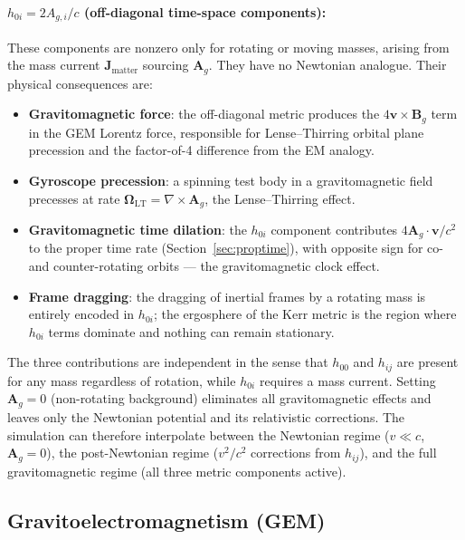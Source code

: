 \documentclass[11pt,a4paper]{article}
\newcommand{\vv}[1]{\mathbf{#1}}
\newcommand{\Ag}{\vv{A}_g}
\begin{document}
\paragraph{$h_{0i} = 2A_{g,i}/c$ (off-diagonal time-space components):}
These components are nonzero only for rotating or moving masses, arising from the mass current $\vv{J}_{\mathrm{matter}}$ sourcing $\Ag$.  They have no Newtonian analogue.  Their physical consequences are:
\begin{itemize}
  \item \textbf{Gravitomagnetic force}: the off-diagonal metric produces the $4\vv{v}\times\vv{B}_g$ term in the GEM Lorentz force, responsible for Lense--Thirring orbital plane precession and the factor-of-4 difference from the EM analogy.
  \item \textbf{Gyroscope precession}: a spinning test body in a gravitomagnetic field precesses at rate $\boldsymbol{\Omega}_{\mathrm{LT}} = \nabla\times\Ag$, the Lense--Thirring effect.
  \item \textbf{Gravitomagnetic time dilation}: the $h_{0i}$ component contributes $4\Ag\cdot\vv{v}/c^2$ to the proper time rate (Section~\ref{sec:proptime}), with opposite sign for co- and counter-rotating orbits --- the gravitomagnetic clock effect.
  \item \textbf{Frame dragging}: the dragging of inertial frames by a rotating mass is entirely encoded in $h_{0i}$; the ergosphere of the Kerr metric is the region where $h_{0i}$ terms dominate and nothing can remain stationary.
\end{itemize}

The three contributions are independent in the sense that $h_{00}$ and $h_{ij}$ are present for any mass regardless of rotation, while $h_{0i}$ requires a mass current.  Setting $\Ag = 0$ (non-rotating background) eliminates all gravitomagnetic effects and leaves only the Newtonian potential and its relativistic corrections.  The simulation can therefore interpolate between the Newtonian regime ($v\ll c$, $\Ag = 0$), the post-Newtonian regime ($v^2/c^2$ corrections from $h_{ij}$), and the full gravitomagnetic regime (all three metric components active).

\subsection{Gravitoelectromagnetism (GEM)}
\end{document}
